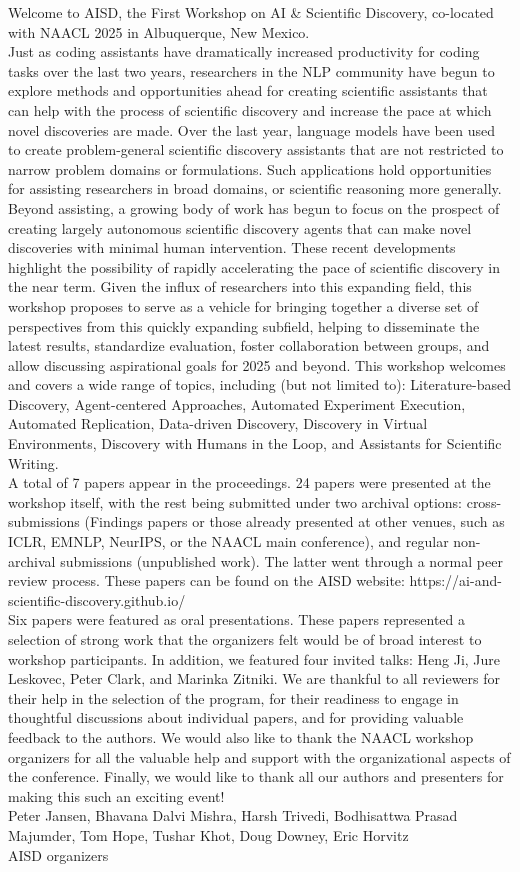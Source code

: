 Welcome to AISD, the First Workshop on AI \& Scientific Discovery, co-located with NAACL 2025 in Albuquerque, New Mexico. \\

Just as coding assistants have dramatically increased productivity for coding tasks over the last two years, researchers in the NLP community have begun to explore methods and opportunities ahead for creating scientific assistants that can help with the process of scientific discovery and increase the pace at which novel discoveries are made. Over the last year, language models have been used to create problem-general scientific discovery assistants that are not restricted to narrow problem domains or formulations. Such applications hold opportunities for assisting researchers in broad domains, or scientific reasoning more generally. Beyond assisting, a growing body of work has begun to focus on the prospect of creating largely autonomous scientific discovery agents that can make novel discoveries with minimal human intervention.
These recent developments highlight the possibility of rapidly accelerating the pace of scientific discovery in the near term. Given the influx of researchers into this expanding field, this workshop proposes to serve as a vehicle for bringing together a diverse set of perspectives from this quickly expanding subfield, helping to disseminate the latest results, standardize evaluation, foster collaboration between groups, and allow discussing aspirational goals for 2025 and beyond. This workshop welcomes and covers a wide range of topics, including (but not limited to): Literature-based Discovery, Agent-centered Approaches, Automated Experiment Execution, Automated Replication, Data-driven Discovery, Discovery in Virtual Environments, Discovery with Humans in the Loop, and Assistants for Scientific Writing. \\

A total of 7 papers appear in the proceedings. 24 papers were presented at the workshop itself, with the rest being submitted under two archival options: cross-submissions (Findings papers or those already presented at other venues, such as ICLR, EMNLP, NeurIPS, or the NAACL main conference), and regular non-archival submissions (unpublished work). The latter went through a normal peer review process. These papers can be found on the AISD website: https://ai-and-scientific-discovery.github.io/ \\

Six papers were featured as oral presentations. These papers represented a selection of strong work that the organizers felt would be of broad interest to workshop participants. In addition, we featured four invited talks: Heng Ji, Jure Leskovec, Peter Clark, and Marinka Zitniki.
We are thankful to all reviewers for their help in the selection of the program, for their readiness to engage in thoughtful discussions about individual papers, and for providing valuable feedback to the authors. We would also like to thank the NAACL workshop organizers for all the valuable help and support with the organizational aspects of the conference. Finally, we would like to thank all our authors and presenters for making this such an exciting event! \\

Peter Jansen, Bhavana Dalvi Mishra, Harsh Trivedi, Bodhisattwa Prasad Majumder, Tom Hope, Tushar Khot, Doug Downey, Eric Horvitz\\
AISD organizers